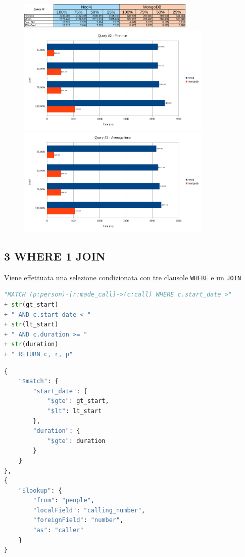    \begin{figure}
        \includegraphics[width=320px, keepaspectratio, center]{query2.png}
    \label{fig:results2}
        \includegraphics[width=350px, keepaspectratio, center]{query2_fr.png}
        \label{fig:query2_fr}
        \includegraphics[width=350px, keepaspectratio, center]{query2_avg.png}
        \label{fig:query2_avg}
    \end{figure}

    \pagebreak
    \subsection{3 WHERE 1 JOIN}
    Viene effettuata una selezione condizionata con tre clausole \texttt{WHERE}
    e un \texttt{JOIN}

    \begin{lstlisting}[language=Python, caption=Neo4j]
"MATCH (p:person)-[r:made_call]->(c:call) WHERE c.start_date >" 
+ str(gt_start) 
+ " AND c.start_date < " 
+ str(lt_start) 
+ " AND c.duration >= " 
+ str(duration) 
+ " RETURN c, r, p"
    \end{lstlisting}


    \begin{lstlisting}[language=Python, caption=MongoDB]
{
    "$match": {
        "start_date": {
            "$gte": gt_start,
            "$lt": lt_start
        },
        "duration": {
            "$gte": duration
        }
    }
},
{
    "$lookup": {
        "from": "people",
        "localField": "calling_number",
        "foreignField": "number",
        "as": "caller"
    }
}
    \end{lstlisting}

